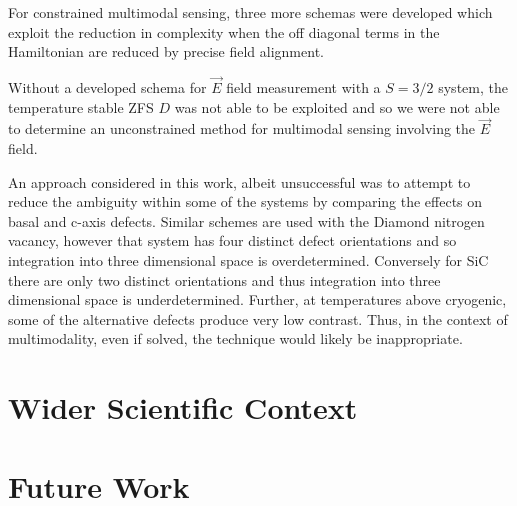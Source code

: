 For constrained multimodal sensing, three more schemas were developed which exploit the reduction in complexity when the off diagonal terms in the Hamiltonian are reduced by precise field alignment. 

Without a developed schema for $\vec{E}$ field measurement with a $S=3/2$ system, the temperature stable ZFS $D$ was not able to be exploited and so we were not able to determine an unconstrained method for multimodal sensing involving the $\vec{E}$ field. 

An approach considered in this work, albeit unsuccessful was to attempt to reduce the ambiguity within some of the systems by comparing the effects on basal and c-axis defects. Similar schemes are used with the Diamond nitrogen vacancy, however that system has four distinct defect orientations and so integration into three dimensional space is overdetermined. Conversely for SiC there are only two distinct orientations and thus integration into three dimensional space is underdetermined. Further, at temperatures above cryogenic, some of the alternative defects produce very low contrast. Thus, in the context of multimodality, even if solved, the technique would likely be inappropriate. 
\section{Wider Scientific Context}
\cite{Kraus2013}

\section{Future Work}






%
%
%
%
